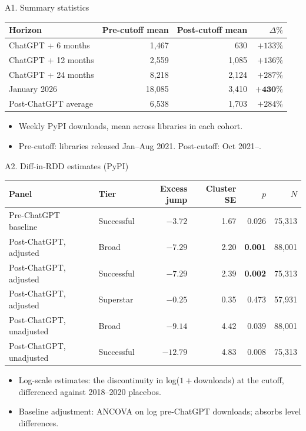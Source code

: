 \documentclass[10pt, aspectratio=169]{beamer}
\begin{document}
\begin{frame}{A1. Summary statistics}
    \centering
    \footnotesize
    \begin{tabular}{lrrr}
        \toprule
        Horizon & Pre-cutoff mean & Post-cutoff mean & $\Delta\%$ \\
        \midrule
        ChatGPT + 6 months  & 1{,}467 & 630   & $+133\%$ \\
        ChatGPT + 12 months & 2{,}559 & 1{,}085 & $+136\%$ \\
        ChatGPT + 24 months & 8{,}218 & 2{,}124 & $+287\%$ \\
        January 2026        & 18{,}085 & 3{,}410 & $\mathbf{+430\%}$ \\
        \midrule
        Post-ChatGPT average & 6{,}538 & 1{,}703 & $+284\%$ \\
        \bottomrule
    \end{tabular}
    \vspace{0.8em}
    \begin{itemize}
        \footnotesize
        \item Weekly PyPI downloads, mean across libraries in each cohort.
        \item Pre-cutoff: libraries released Jan--Aug 2021. Post-cutoff: Oct 2021--.
    \end{itemize}
\end{frame}

\begin{frame}{A2. Diff-in-RDD estimates (PyPI)}
    \centering
    \footnotesize
    \begin{tabular}{llrrrr}
        \toprule
        Panel & Tier & Excess jump & Cluster SE & $p$ & $N$ \\
        \midrule
        Pre-ChatGPT baseline     & Successful & $-3.72$ & 1.67 & 0.026 & 75{,}313 \\
        \midrule
        Post-ChatGPT, adjusted   & Broad      & $-7.29$ & 2.20 & \textbf{0.001} & 88{,}001 \\
        Post-ChatGPT, adjusted   & Successful & $-7.29$ & 2.39 & \textbf{0.002} & 75{,}313 \\
        Post-ChatGPT, adjusted   & Superstar  & $-0.25$ & 0.35 & 0.473 & 57{,}931 \\
        \midrule
        Post-ChatGPT, unadjusted & Broad      & $-9.14$ & 4.42 & 0.039 & 88{,}001 \\
        Post-ChatGPT, unadjusted & Successful & $-12.79$ & 4.83 & 0.008 & 75{,}313 \\
        \bottomrule
    \end{tabular}
    \vspace{0.8em}
    \begin{itemize}
        \footnotesize
        \item Log-scale estimates: the discontinuity in log($1 + $downloads) at the cutoff, differenced against 2018--2020 placebos.
        \item Baseline adjustment: ANCOVA on log pre-ChatGPT downloads; absorbs level differences.
    \end{itemize}
\end{frame}
\end{document}
